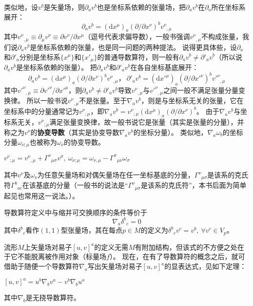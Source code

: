 类似地，设$v^b$是矢量场，则$\partial_av^b$也是坐标系依赖的张量场，把$\partial_av^b$在$\partial_a$所在坐标系展开：
$$\partial_av^b = (\mathrm{d}x^\mu)_a(\partial / \partial x^\nu)^bv^\nu{}_{,\mu}$$
其中$v^\nu{}_{,\mu} \equiv \partial_\mu v^\nu \equiv \partial v^\nu / \partial x^\mu$（逗号代表求偏导数），一般书强调$v^\nu{}_{,\mu}$不构成张量，我们说$\partial_av^b$是坐标系依赖的张量，也是同一问题的两种提法。
说得更具体些，设$\partial_a$和$\partial'_a$分别是坐标系$\{x^\mu\}$和$\{x'_\mu\}$的普通导数算符，则一般有$\partial_av^b \neq \partial'_av^b$（所以说$\partial_av^b$是坐标系依赖的张量）。
把$\partial_av^b$和$\partial'_av^b$在各自坐标基底展开：
$$\partial_av^b = (\mathrm{d}x^\mu)_a(\partial / \partial x^\nu)^bv^\nu{}_{,\mu}， ~ \partial'_av^b = (\mathrm{d}x'^\mu)_a(\partial / \partial x'^\nu)^bv'^\nu{}_{,\mu}$$
其中$v'^\nu{}_{,\mu} \equiv \partial v'^\nu / \partial x'^\mu$，则$\partial_av^b \neq \partial'_av^b$导致$v^\nu{}_{,\mu}$与$v'^\nu{}_{,\mu}$之间一般不满足张量分量变换律。
所以一般书说$v^\nu{}_{,\mu}$不是张量。至于$\nabla_av^b$，则是与坐标系无关的张量，它在坐标系中的分量通常记为$v^\nu{}_{;\mu}$，即$\nabla_av^b = v^\nu{}_{;\mu}(\mathrm{d}x^\mu)_a(\partial / \partial x^\nu)^b$。
由于$\nabla_av^b$与坐标系无关，$v^\nu{}_{;\mu}$满足张量变换律，故一般书说它是张量（其实是张量的分量），并称之为$v^\nu$的\textbf{协变导数}（其实是协变导数$\nabla_av^b$的坐标分量）。
类似地，$\nabla_a\omega_b$的坐标分量$\omega_{\nu;\mu}$也被称为$\omega_\nu$的协变导数。

\begin{theorem}
$v^\nu{}_{;\mu} = v^\nu{}_{,\mu} + \Gamma^\nu{}_{\mu\sigma}v^\sigma, ~ \omega_{\nu;\mu} = \omega_{\nu,\mu} - \Gamma^\sigma{}_{\mu\nu}\omega_\sigma$

其中$v^\nu$及$\omega_\nu$为任意矢量场和对偶矢量场在任一坐标基底的分量，$\Gamma^\nu{}_{\mu\sigma}$是该系的克氏符$\Gamma^b{}_{ac}$在该基底的分量（一般书的说法是``$\Gamma^\nu{}_{\mu\sigma}$是该系的克氏符''，本书后面为简单起见也常用这一说法。）。
\end{theorem}

\begin{theorem}
导数算符定义中与缩并可交换顺序的条件等价于
$$\nabla_a\delta^b{}_c = 0$$
其中$\delta^b{}_c$看作$(1, 1)$型张量场，其在每点$p \in M$的定义为$\delta^b{}_cv^c = v^b, ~ \forall v^c \in V_p$。
\end{theorem}

流形$M$上矢量场对易子$[u, v]^a$的定义无需$M$有附加结构，但该式的不方便之处在于它不能脱离被作用对象（标量场$f$）。
现在，在有了导数算符的概念之后，就可借助于随便一个导数算符$\nabla_a$写出矢量场对易子$[u, v]^a$的显表达式，见如下定理：
\begin{theorem}
$[u, v]^a = u^b\nabla_bv^a - v^b\nabla_bu^a$

其中$\nabla_b$是无挠导数算符。
\end{theorem}

